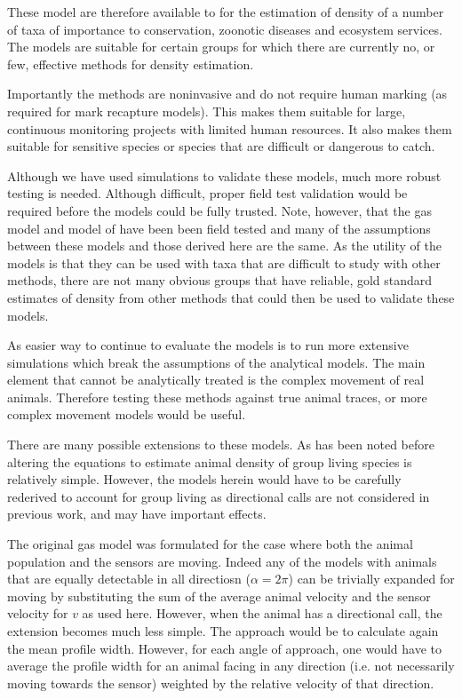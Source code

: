 \documentclass[a4paper,10pt,reqno,oneside]{amsart}
\begin{document}
These model are therefore available to for the estimation of density of a number of taxa of importance to conservation, zoonotic diseases and ecosystem services. The models are suitable for certain groups for which there are currently no, or few, effective methods for density estimation. 

Importantly the methods are noninvasive and do not require human marking (as required for mark recapture models). This makes them suitable for large, continuous monitoring projects with limited human resources. It also makes them suitable for sensitive species or species that are difficult or dangerous to catch.

Although we have used simulations to validate these models, much more robust testing is needed. Although difficult, proper field test validation would be required before the models could be fully trusted. Note, however, that the gas model and model of \cite{rowcliffe2008estimating} have been been field tested and many of the assumptions between these models and those derived here are the same. As the utility of the models is that they can be used with taxa that are difficult to study with other methods, there are not many obvious groups that have reliable, gold standard estimates of density from other methods that could then be used to validate these models.

As easier way to continue to evaluate the models is to run more extensive simulations which break the assumptions of the analytical models. The main element that cannot be analytically treated is the complex movement of real animals. Therefore testing these methods against true animal traces, or more complex movement models would be useful.

There are many possible extensions to these models. As has been noted before \citep{rowcliffe2008estimating,Hutchinson_Waser_2007} altering the equations to estimate animal density of group living species is relatively simple. However, the models herein would have to be carefully rederived to account for group living as directional calls are not considered in previous work, and may have important effects.

The original gas model was formulated for the case where both the animal population and the sensors are moving. Indeed any of the models with animals that are equally detectable in all directiosn ($\alpha = 2\pi$) can be trivially expanded for moving by substituting the sum of the average animal velocity and the sensor velocity for $v$ as used here. However, when the animal has a directional call, the extension becomes much less simple. The approach would be to calculate again the mean profile width. However, for each angle of approach, one would have to average the profile width for an animal facing in any direction (i.e. not necessarily moving towards the sensor) weighted by the relative velocity of that direction.
\end{document}
